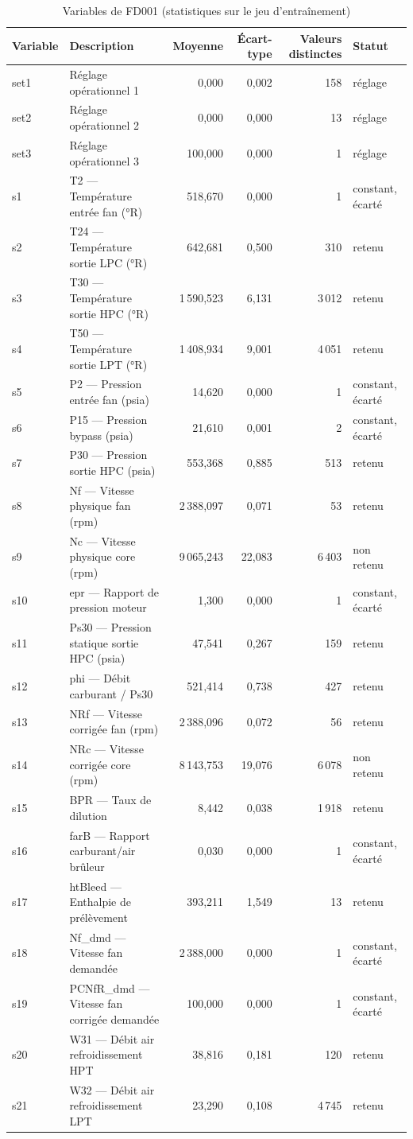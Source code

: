 \begin{table}[htbp]
\centering
\caption{Variables de FD001 (statistiques sur le jeu d'entraînement)}
\label{tab:donnees_capteurs}
\begin{tabular}{llrrrl}
\toprule
Variable & Description & Moyenne & Écart-type & Valeurs distinctes & Statut \\
\midrule
set1 & Réglage opérationnel 1 & 0,000 & 0,002 & 158 & réglage \\
set2 & Réglage opérationnel 2 & 0,000 & 0,000 & 13 & réglage \\
set3 & Réglage opérationnel 3 & 100,000 & 0,000 & 1 & réglage \\
s1 & T2 — Température entrée fan (°R) & 518,670 & 0,000 & 1 & constant, écarté \\
s2 & T24 — Température sortie LPC (°R) & 642,681 & 0,500 & 310 & retenu \\
s3 & T30 — Température sortie HPC (°R) & 1 590,523 & 6,131 & 3 012 & retenu \\
s4 & T50 — Température sortie LPT (°R) & 1 408,934 & 9,001 & 4 051 & retenu \\
s5 & P2 — Pression entrée fan (psia) & 14,620 & 0,000 & 1 & constant, écarté \\
s6 & P15 — Pression bypass (psia) & 21,610 & 0,001 & 2 & constant, écarté \\
s7 & P30 — Pression sortie HPC (psia) & 553,368 & 0,885 & 513 & retenu \\
s8 & Nf — Vitesse physique fan (rpm) & 2 388,097 & 0,071 & 53 & retenu \\
s9 & Nc — Vitesse physique core (rpm) & 9 065,243 & 22,083 & 6 403 & non retenu \\
s10 & epr — Rapport de pression moteur & 1,300 & 0,000 & 1 & constant, écarté \\
s11 & Ps30 — Pression statique sortie HPC (psia) & 47,541 & 0,267 & 159 & retenu \\
s12 & phi — Débit carburant / Ps30 & 521,414 & 0,738 & 427 & retenu \\
s13 & NRf — Vitesse corrigée fan (rpm) & 2 388,096 & 0,072 & 56 & retenu \\
s14 & NRc — Vitesse corrigée core (rpm) & 8 143,753 & 19,076 & 6 078 & non retenu \\
s15 & BPR — Taux de dilution & 8,442 & 0,038 & 1 918 & retenu \\
s16 & farB — Rapport carburant/air brûleur & 0,030 & 0,000 & 1 & constant, écarté \\
s17 & htBleed — Enthalpie de prélèvement & 393,211 & 1,549 & 13 & retenu \\
s18 & Nf\_dmd — Vitesse fan demandée & 2 388,000 & 0,000 & 1 & constant, écarté \\
s19 & PCNfR\_dmd — Vitesse fan corrigée demandée & 100,000 & 0,000 & 1 & constant, écarté \\
s20 & W31 — Débit air refroidissement HPT & 38,816 & 0,181 & 120 & retenu \\
s21 & W32 — Débit air refroidissement LPT & 23,290 & 0,108 & 4 745 & retenu \\
\bottomrule
\end{tabular}
\end{table}
